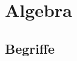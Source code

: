 \documentclass{scrartcl}
\newcommand{\key}[1]{{\textcolor{blue}{\textbf{#1}}}}
\newcommand{\select}{\textbf{select }}
\newcommand{\from}{\textbf{from }}
\newcommand{\where}{\textbf{where }}
\begin{document}
%
%

\section{Algebra}

\subsection{Begriffe}
\end{document}
